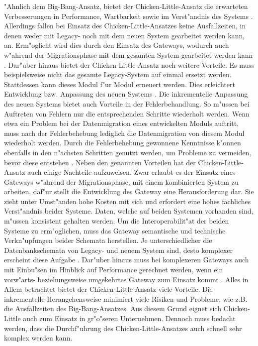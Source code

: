 \lb
"Ahnlich dem Big-Bang-Ansatz, bietet der Chicken-Little-Ansatz die erwarteten Verbesserungen in Performance, Wartbarkeit sowie im Verst"andnis des Systems \citep[S.~108]{bisbal-1999}. Allerdings fallen bei Einsatz des Chicken-Little-Ansatzes keine Ausfallzeiten, in denen weder mit Legacy- noch mit dem neuen System gearbeitet werden kann, an. Erm"oglicht wird dies durch den Einsatz des Gateways, wodurch auch w"ahrend der Migrationsphase mit dem gesamten System gearbeitet werden kann \citep[S.~2]{wuLawless-1997}. Dar"uber hinaus bietet der Chicken-Little-Ansatz noch weitere Vorteile. Es muss beispielsweise nicht das gesamte Legacy-System auf einmal ersetzt werden. Stattdessen kann dieses Modul f"ur Modul erneuert werden. Dies erleichtert Entwicklung bzw. Anpassung des neuen Systems \citep[S.~3]{brodie-1993}. Die inkrementelle Anpassung des neuen Systems bietet auch Vorteile in der Fehlerbehandlung. So m"ussen bei Auftreten von Fehlern nur die entsprechenden Schritte wiederholt werden. Wenn etwa ein Problem bei der Datenmigration eines entwickelten Moduls auftritt, muss nach der Fehlerbehebung lediglich die Datenmigration von diesem Modul wiederholt werden. Durch die Fehlerbehebung gewonnene Kenntnisse k"onnen ebenfalls in den n"achsten Schritten genutzt werden, um Probleme zu vermeiden, bevor diese entstehen \citep[S.~3]{brodie-1993}.
\lb
Neben den genannten Vorteilen hat der Chicken-Little-Ansatz auch einige Nachteile aufzuweisen. Zwar erlaubt es der Einsatz eines Gateways w"ahrend der Migrationsphase, mit einem kombinierten System zu arbeiten, daf"ur stellt die Entwicklung des Gateway eine Herausforderung dar. Sie zieht unter Umst"anden hohe Kosten mit sich und erfordert eine hohes fachliches Verst"andnis beider Systeme. Daten, welche auf beiden Systemen vorhanden sind, m"ussen konsistent gehalten werden. Um die Interoperabilit"at der beiden Systeme zu erm"oglichen, muss das Gateway semantische und technische Verkn"upfungen beider Schemata herstellen. Je unterschiedlicher die Datenbankschemata von Legacy- und neuem System sind, desto komplexer erscheint diese Aufgabe \citep[S.~2f.]{wuLawless-1997}. Dar"uber hinaus muss bei komplexeren Gateways auch mit Einbu"sen im Hinblick auf Performance gerechnet werden, wenn ein vorw"arts- beziehungsweise umgekehrtes Gateway zum Einsatz kommt \citep[S.~109]{bisbal-1999}.
\lb
Alles in Allem betrachtet bietet der Chicken-Little-Ansatz viele Vorteile. Die inkrementelle Herangehensweise minimiert viele Risiken und Probleme, wie z.B. die Ausfallzeiten des Big-Bang-Ansatzes. Aus diesem Grund eignet sich Chicken-Little auch zum Einsatz in gr"o"seren Unternehmen. Dennoch muss bedacht werden, dass die Durchf"uhrung des Chicken-Little-Ansatzes auch schnell sehr komplex werden kann.

